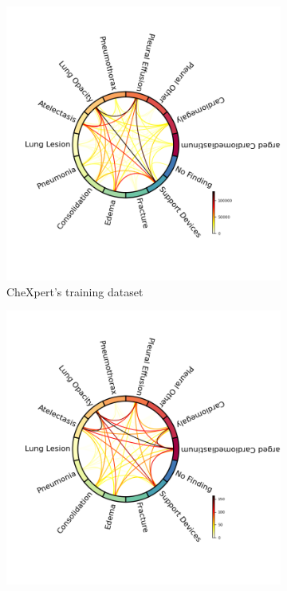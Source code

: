 \documentclass[11pt]{article}
\begin{document}
\begin{figure}[h!]
     \begin{subfigure}[b]{0.45\linewidth}
         \centering
         \includegraphics[width=\linewidth]{plots/chords_chexpert_train}
         \caption{CheXpert's training dataset}
         \vspace{4ex}
         \label{fig:chords_chexpert_train}
     \end{subfigure}
     \hfill
     \begin{subfigure}[b]{0.45\linewidth}
         \centering
         \includegraphics[width=\linewidth]{plots/chords_chexpert_valid}

\end{subfigure}
\end{figure}
\end{document}
